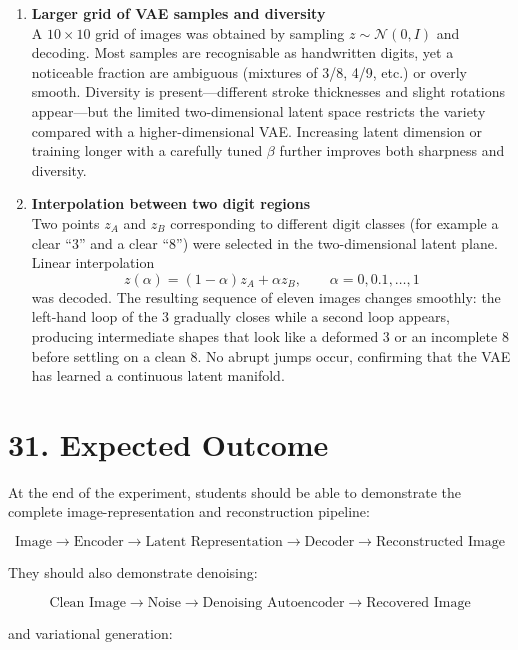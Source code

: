 \documentclass[10pt]{article}
\begin{document}
\begin{enumerate}
\item \textbf{Larger grid of VAE samples and diversity}
\\[0.3em]
A $10\times10$ grid of images was obtained by sampling $z\sim\mathcal{N}(0,I)$ and decoding. Most samples are recognisable as handwritten digits, yet a noticeable fraction are ambiguous (mixtures of 3/8, 4/9, etc.) or overly smooth. Diversity is present---different stroke thicknesses and slight rotations appear---but the limited two-dimensional latent space restricts the variety compared with a higher-dimensional VAE. Increasing latent dimension or training longer with a carefully tuned $\beta$ further improves both sharpness and diversity.\\

\item \textbf{Interpolation between two digit regions}
\\[0.3em]
Two points $z_A$ and $z_B$ corresponding to different digit classes (for example a clear ``3'' and a clear ``8'') were selected in the two-dimensional latent plane. Linear interpolation
\[
z(\alpha)=(1-\alpha)z_A+\alpha z_B,\qquad\alpha=0,0.1,\dots,1
\]
was decoded. The resulting sequence of eleven images changes smoothly: the left-hand loop of the 3 gradually closes while a second loop appears, producing intermediate shapes that look like a deformed 3 or an incomplete 8 before settling on a clean 8. No abrupt jumps occur, confirming that the VAE has learned a continuous latent manifold.

\end{enumerate}
\section*{31. Expected Outcome}

At the end of the experiment, students should be able to demonstrate the
complete image-representation and reconstruction pipeline:

\[
\boxed{
\text{Image}
\rightarrow
\text{Encoder}
\rightarrow
\text{Latent Representation}
\rightarrow
\text{Decoder}
\rightarrow
\text{Reconstructed Image}
}
\]

They should also demonstrate denoising:

\[
\boxed{
\text{Clean Image}
\rightarrow
\text{Noise}
\rightarrow
\text{Denoising Autoencoder}
\rightarrow
\text{Recovered Image}
}
\]

and variational generation:
\end{document}
